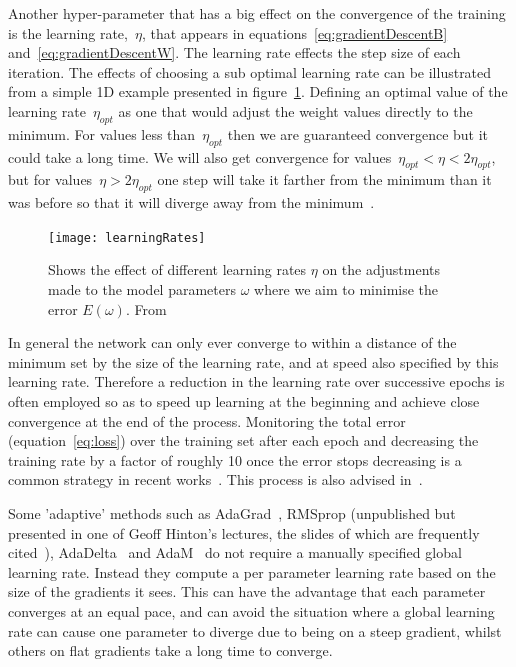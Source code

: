 \documentclass[11pt]{article} %
\begin{document}
Another hyper-parameter that has a big effect on the convergence of the training is the learning rate,~$\eta$, that appears in equations~\ref{eq:gradientDescentB} and~\ref{eq:gradientDescentW}. The learning rate effects the step size of each iteration. The effects of choosing a sub optimal learning rate can be illustrated from a simple 1D example presented in figure~\ref{fig:learningRates}. Defining an optimal value of the learning rate~$\eta_{opt}$ as one that would adjust the weight values directly to the minimum. For values less than~$\eta_{opt}$ then we are guaranteed convergence but it could take a long time. We will also get convergence for values~$\eta_{opt} < \eta <  2 \eta_{opt}$, but for values~$\eta > 2 \eta_{opt}$ one step will take it farther from the minimum than it was before so that it will diverge away from the minimum~\cite{LeCun1998a}.
\begin{figure}
\centering
\texttt{[image: learningRates]}
\caption{Shows the effect of different learning rates $\eta$ on the adjustments made to the model parameters $\omega$ where we aim to minimise the error $E(\omega)$.   From~\cite{LeCun1998a}		\label{fig:learningRates}  } 
\end{figure}

In general the network can only ever converge to within a distance of the minimum set by the size of the learning rate, and at speed also specified by this learning rate. Therefore a reduction in the learning rate over successive epochs is often employed so as to speed up learning at the beginning and achieve close convergence at the end of the process. Monitoring the total error (equation~\ref{eq:loss}) over the training set after each epoch and decreasing the training rate by a factor of roughly 10 once the error stops decreasing is a common strategy in recent works~\cite{Zeiler2014,Pfister,Simonyan2015,Sermanet2013b}. This process is also advised in~\cite{Bottou2012}. 

Some 'adaptive' methods such as AdaGrad~\cite{Duchi2011}, RMSprop (unpublished but presented in one of Geoff Hinton's lectures, the slides of which are frequently cited~\cite{hintonLects}), AdaDelta~\cite{Zeiler2012} and AdaM~\cite{Kingma2015} do not require a manually specified global learning rate. Instead they compute a per parameter learning rate based on the size of the gradients it sees. This can have the advantage that each parameter converges at an equal pace, and can avoid the situation where a global learning rate can cause one parameter to diverge due to being on a steep gradient, whilst others on flat gradients take a long time to converge.
\end{document}
